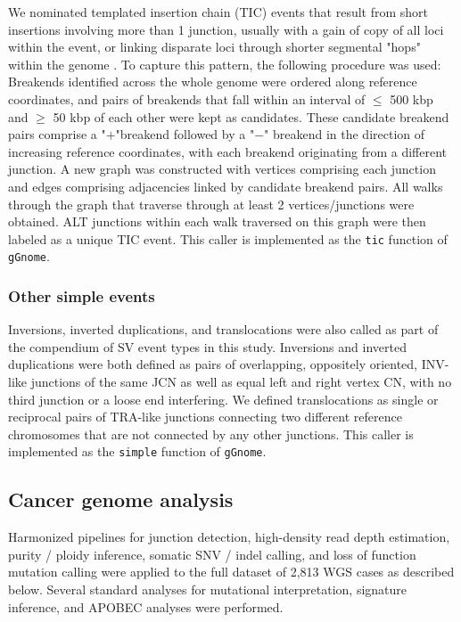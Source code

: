 \documentclass[phd,tocprelim]{cornell}
\newcommand{\ttt}[1]{\texttt{#1}}
\begin{document}
We nominated templated insertion chain (TIC) events that result from short insertions involving more than 1 junction, usually with a gain of copy of all loci within the event, or linking disparate loci through shorter segmental "hops" within the genome \cite{Li2020sv}. To capture this pattern, the following procedure was used: Breakends identified across the whole genome were ordered along reference coordinates, and pairs of breakends that fall within an interval of $\le$ 500 kbp and $\ge$ 50 kbp of each other were kept as candidates. These candidate breakend pairs comprise a "$+$"breakend followed by a "$-$" breakend in the direction of increasing reference coordinates, with each breakend originating from a different junction. A new graph was constructed with vertices comprising each junction and edges comprising adjacencies linked by candidate breakend pairs. All walks through the graph that traverse through at least 2 vertices/junctions were obtained. ALT junctions within each  walk traversed on this graph were then labeled as a unique TIC event.  This caller is implemented as the \ttt{tic} function of \ttt{gGnome}.



\subsubsection*{Other simple events}

Inversions, inverted duplications, and translocations were also called as part of the compendium of SV event types in this study. Inversions and inverted duplications were both defined as pairs of overlapping, oppositely oriented, INV-like junctions of the same JCN as well as equal left and right vertex CN, with no third junction or a loose end interfering. We defined translocations as single or reciprocal pairs of TRA-like junctions connecting two different reference chromosomes that are not connected by any other junctions.  This caller is implemented as the \ttt{simple} function of \ttt{gGnome}.

\subsection*{Cancer genome analysis} Harmonized pipelines for junction detection, high-density read depth estimation, purity / ploidy inference, somatic SNV / indel calling, and loss of function mutation calling were applied to the full dataset of 2,813 WGS cases as described below. Several standard analyses for mutational interpretation, signature inference, and APOBEC analyses were performed. 
\end{document}

